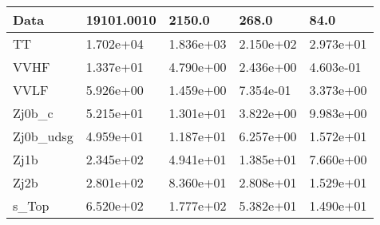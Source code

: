 \begin{table}
{\begin{tabularx}{\textwidth}{|X|X|X|X|X|}
\hline
Data & 19101.0010 & 2150.0 & 268.0 & 84.0 \\
\hline
TT & 1.702e+04 & 1.836e+03 & 2.150e+02 & 2.973e+01 \\
VVHF & 1.337e+01 & 4.790e+00 & 2.436e+00 & 4.603e-01 \\
VVLF & 5.926e+00 & 1.459e+00 & 7.354e-01 & 3.373e+00 \\
Zj0b\_c & 5.215e+01 & 1.301e+01 & 3.822e+00 & 9.983e+00 \\
Zj0b\_udsg & 4.959e+01 & 1.187e+01 & 6.257e+00 & 1.572e+01 \\
Zj1b & 2.345e+02 & 4.941e+01 & 1.385e+01 & 7.660e+00 \\
Zj2b & 2.801e+02 & 8.360e+01 & 2.808e+01 & 1.529e+01 \\
s\_Top & 6.520e+02 & 1.777e+02 & 5.382e+01 & 1.490e+01 \\
\hline
\end{tabularx}
}
\label{tab:cr-Zmm-2016}
\end{table}

